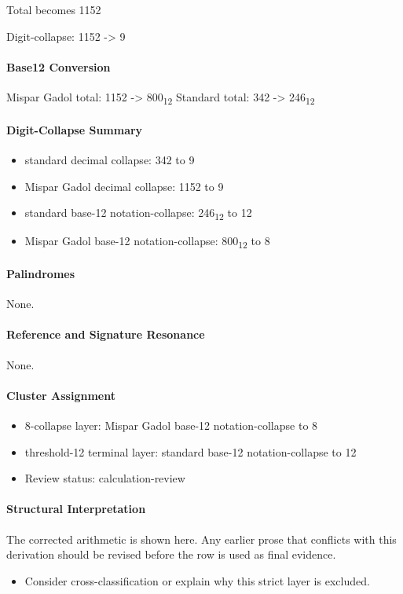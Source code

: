 Total becomes 1152

Digit-collapse: 1152 -> 9
\paragraph{Base12 Conversion}
Mispar Gadol total: 1152 -> 800\textsubscript{12}
Standard total: 342 -> 246\textsubscript{12}
\paragraph{Digit-Collapse Summary}
\begin{itemize}
\item standard decimal collapse: 342 to 9
\item Mispar Gadol decimal collapse: 1152 to 9
\item standard base-12 notation-collapse: 246\textsubscript{12} to 12
\item Mispar Gadol base-12 notation-collapse: 800\textsubscript{12} to 8
\end{itemize}
\paragraph{Palindromes}
None.
\paragraph{Reference and Signature Resonance}
None.
\paragraph{Cluster Assignment}
\begin{itemize}
\item 8-collapse layer: Mispar Gadol base-12 notation-collapse to 8
\item threshold-12 terminal layer: standard base-12 notation-collapse to 12
\item Review status: calculation-review
\end{itemize}
\paragraph{Structural Interpretation}
The corrected arithmetic is shown here. Any earlier prose that conflicts with this derivation should be revised before the row is used as final evidence.

\begin{itemize}
\item Consider cross-classification or explain why this strict layer is excluded.
\end{itemize}

